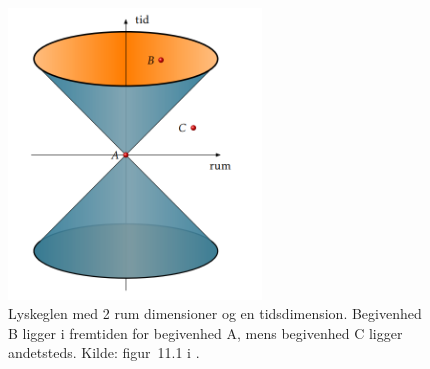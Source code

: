 \begin{figure}
    \centering
    \includegraphics[width = 0.6\textwidth]{SR/billeder/lyskeglen.png}
    \caption{Lyskeglen med 2 rum dimensioner og en tidsdimension. Begivenhed \textrm{B} ligger i fremtiden for begivenhed \textrm{A}, mens begivenhed \textrm{C} ligger andetsteds. Kilde: figur~11.1 i \cite{uggerhojSpecielRelativitetsteori2016}.}
    \label{fig:lyskeglen}
\end{figure}


